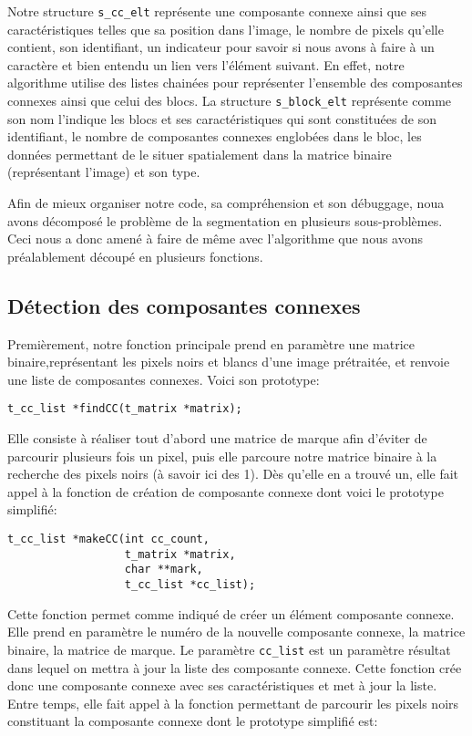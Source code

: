 \documentclass[a4paper,10pt]{report}
\begin{document}
Notre structure \verb!s_cc_elt! représente une composante connexe ainsi que
ses caractéristiques telles que sa position dans l'image, le nombre de
pixels qu'elle contient, son identifiant, un indicateur pour savoir si
nous avons à faire à un caractère et bien entendu un lien vers l'élément
suivant. En effet, notre algorithme utilise des listes chainées pour
représenter l'ensemble des composantes connexes ainsi que celui des
blocs.
La structure \verb!s_block_elt! représente comme son nom l'indique les blocs et
ses caractéristiques qui sont constituées de son identifiant, le nombre
de composantes connexes englobées dans le bloc, les données permettant
de le situer spatialement dans la matrice binaire (représentant
l'image) et son type.

Afin de mieux organiser notre code, sa compréhension et son débuggage,
noua avons décomposé le problème de la segmentation en plusieurs
sous-problèmes. Ceci nous a donc amené à faire de même avec l'algorithme
que nous avons préalablement découpé en plusieurs fonctions.

\subsection{Détection des composantes connexes}
Premièrement, notre fonction principale prend en paramètre une matrice
binaire,représentant les pixels noirs et blancs d'une image prétraitée, et
renvoie une liste de composantes connexes. Voici son prototype:

\begin{lstlisting}
t_cc_list *findCC(t_matrix *matrix);
\end{lstlisting}

Elle consiste à réaliser tout d'abord une matrice de marque afin
d'éviter de parcourir plusieurs fois un pixel, puis elle parcoure notre
matrice binaire à la recherche des pixels noirs (à savoir ici des 1).
Dès qu'elle en a trouvé un, elle fait appel à la fonction de création de
composante connexe dont voici le prototype simplifié:

\begin{lstlisting}
t_cc_list *makeCC(int cc_count,
                  t_matrix *matrix,
                  char **mark,
                  t_cc_list *cc_list);
\end{lstlisting}

Cette fonction permet comme indiqué de créer un élément composante
connexe. Elle prend en paramètre le numéro de la nouvelle composante
connexe, la matrice binaire, la matrice de marque. Le paramètre \verb!cc_list!
est un paramètre résultat dans lequel on mettra à jour la liste des
composante connexe. Cette fonction crée donc une composante connexe avec
ses caractéristiques et met à jour la liste. Entre temps, elle fait
appel à la fonction permettant de parcourir les pixels noirs constituant
la composante connexe dont le prototype simplifié est:
\end{document}
